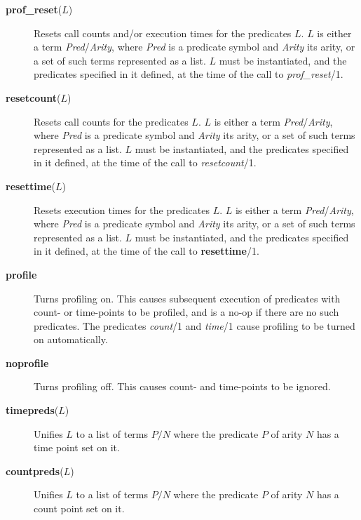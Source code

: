 \begin{description}
\item[{\bf prof\_reset}($L$)]
    Resets call counts and/or execution times for the predicates $L$.
    $L$ is either a term {\em Pred}/{\em Arity}, where {\em Pred} is
    a predicate symbol and {\em Arity} its arity, or a set of such terms
    represented as a list.
    $L$ must be instantiated, and the predicates specified in it defined,
    at the time of the call to {\em prof\_reset}/1.

\item[{\bf resetcount}($L$)]
    Resets call counts for the predicates $L$.
    $L$ is either a term {\em Pred}/{\em Arity}, where {\em Pred} is
    a predicate symbol and {\em Arity} its arity, or a set of such terms
    represented as a list.
    $L$ must be instantiated, and the predicates specified in it defined,
    at the time of the call to {\em resetcount}/1.

\item[{\bf resettime}($L$)] 
    Resets execution times for the predicates $L$.
    $L$ is either a term {\em Pred}/{\em Arity}, where {\em Pred} is
    a predicate symbol and {\em Arity} its arity, or a set of such terms
    represented as a list.
    $L$ must be instantiated, and the predicates specified in it defined,
    at the time of the call to {\bf resettime}/1.

\item[{\bf profile}] 
    Turns profiling on.
    This causes subsequent execution of predicates with count- or time-points
    to be profiled, and is a no-op if there are no such predicates.
    The predicates {\em count}/1 and {\em time}/1 cause profiling
    to be turned on automatically.

\item[{\bf noprofile}] 
    Turns profiling off.
    This causes count- and time-points to be ignored.

\item[{\bf timepreds}($L$)] 
    Unifies $L$ to a list of terms $P/N$ where the predicate $P$ of arity $N$
    has a time point set on it.

\item[{\bf countpreds}($L$)] 
    Unifies $L$ to a list of terms $P/N$ where the predicate $P$ of arity $N$
    has a count point set on it.


\end{description}
